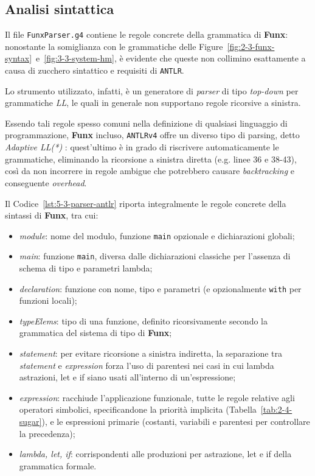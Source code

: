 \subsection{Analisi sintattica}
\label{sec:5-3-syntactic-analysis}

Il file \texttt{FunxParser.g4} contiene le regole concrete della grammatica di \textbf{Funx}:
nonostante la somiglianza con le grammatiche delle Figure~\ref{fig:2-3-funx-syntax}~e~\ref{fig:3-3-system-hm},
è evidente che queste non collimino esattamente a causa di zucchero sintattico e requisiti di \texttt{ANTLR}.

\noindent Lo strumento utilizzato, infatti, è un generatore di \textit{parser} di tipo \textit{top-down}
per grammatiche \textit{LL}, le quali in generale non supportano regole ricorsive a sinistra.

\noindent Essendo tali regole spesso comuni nella definizione di qualsiasi linguaggio di programmazione, \textbf{Funx} incluso,
\texttt{ANTLRv4} offre un diverso tipo di parsing, detto \textit{Adaptive LL(*)} \cite{Parr-2011-FoundationANTLR,Parr-2014-AdaptiveLL}:
quest'ultimo è in grado di riscrivere automaticamente le grammatiche, eliminando la ricorsione a sinistra diretta (e.g. linee 36 e 38-43),
così da non incorrere in regole ambigue che potrebbero causare \textit{backtracking} e conseguente \textit{overhead}.

\noindent Il Codice~\ref{lst:5-3-parser-antlr} riporta integralmente le regole concrete della sintassi di \textbf{Funx}, tra cui:
\begin{itemize}
    \item \textit{module}: nome del modulo, funzione \texttt{main} opzionale e dichiarazioni globali;
    \item \textit{main}: funzione \texttt{main}, diversa dalle dichiarazioni classiche per l'assenza di schema di tipo e parametri lambda;
    \item \textit{declaration}: funzione con nome, tipo e parametri (e opzionalmente \texttt{with} per funzioni locali);
    \item \textit{typeElems}: tipo di una funzione, definito ricorsivamente secondo la grammatica del sistema di tipo di \textbf{Funx};
    \item \textit{statement}: per evitare ricorsione a sinistra indiretta, la separazione tra \textit{statement} e \textit{expression}
          forza l'uso di parentesi nei casi in cui lambda astrazioni, let e if siano usati all'interno di un'espressione;
    \item \textit{expression}: racchiude l'applicazione funzionale, tutte le regole relative agli operatori simbolici,
          specificandone la priorità implicita (Tabella~\ref{tab:2-4-sugar}), e le espressioni primarie
          (costanti, variabili e parentesi per controllare la precedenza);
    \item \textit{lambda, let, if}: corrispondenti alle produzioni per astrazione, let e if della grammatica formale.
\end{itemize}

